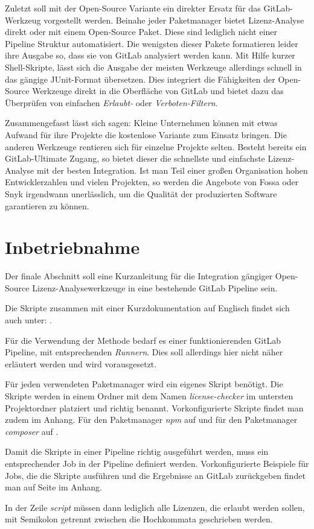 Zuletzt soll mit der Open-Source Variante ein direkter Ersatz für das GitLab-Werkzeug vorgestellt werden. 
Beinahe jeder Paketmanager bietet Lizenz-Analyse direkt oder mit einem Open-Source Paket. Diese sind lediglich nicht einer Pipeline Struktur automatisiert. 
Die wenigsten dieser Pakete formatieren leider ihre Ausgabe so, dass sie von GitLab analysiert werden kann. Mit Hilfe kurzer Shell-Skripte, lässt sich die Ausgabe der meisten Werkzeuge allerdings schnell in das gängige JUnit-Format \cite{ibmJUnitStandard} übersetzen. Dies integriert die Fähigkeiten der Open-Source Werkzeuge direkt in die Oberfläche von GitLab und bietet dazu das Überprüfen von einfachen \emph{Erlaubt-} oder \emph{Verboten-Filtern}.

Zusammengefasst lässt sich sagen: Kleine Unternehmen können mit etwas Aufwand für ihre Projekte die kostenlose Variante zum Einsatz bringen. Die anderen Werkzeuge rentieren sich für einzelne Projekte selten. Besteht bereits ein GitLab-Ultimate Zugang, so bietet dieser die schnellste und einfachste Lizenz-Analyse mit der besten Integration. Ist man Teil einer großen Organisation hohen Entwicklerzahlen und vielen Projekten, so werden die Angebote von Fossa oder Snyk irgendwann unerlässlich, um die Qualität der produzierten Software garantieren zu können.


\section{Inbetriebnahme}

Der finale Abschnitt soll eine Kurzanleitung für die Integration gängiger Open-Source Lizenz-Analysewerkzeuge in eine bestehende GitLab Pipeline sein.

Die Skripte zusammen mit einer Kurzdokumentation auf Englisch findet sich auch unter: \cite{kellOpenSourceLicenseChecker2021}. 

Für die Verwendung der Methode bedarf es einer funktionierenden GitLab Pipeline, mit entsprechenden \emph{Runnern}. Dies soll allerdings hier nicht näher erläutert werden und wird vorausgesetzt. 

Für jeden verwendeten Paketmanager wird ein eigenes Skript benötigt. Die Skripte werden in einem Ordner mit dem Namen \emph{license-checker} im untersten Projektordner platziert und richtig benannt. 
Vorkonfigurierte Skripte findet man zudem im Anhang. Für den Paketmanager \emph{npm} auf  und für den Paketmanager \emph{composer} auf . 

Damit die Skripte in einer Pipeline richtig ausgeführt werden, muss ein entsprechender Job in der Pipeline definiert werden. Vorkonfigurierte Beispiele für Jobs, die die Skripte ausführen und die Ergebnisse an GitLab zurückgeben findet man auf Seite  im Anhang.

In der Zeile \emph{script} müssen dann lediglich alle Lizenzen, die erlaubt werden sollen, mit Semikolon getrennt zwischen die Hochkommata geschrieben werden.